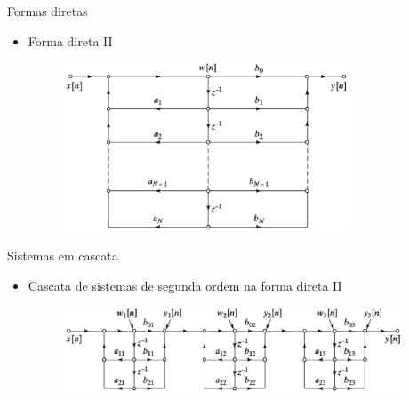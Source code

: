 \begin{slide}{Formas diretas}
   \begin{itemize}
     \item Forma direta II
   \begin{figure}
       \centering
        \includegraphics[width = 0.8\textwidth]{figs/f2.eps}
   \end{figure}
  \end{itemize}
\end{slide}

\begin{slide}{Sistemas em cascata }
\begin{itemize}
   \item Cascata de sistemas de segunda ordem na forma direta II
   \begin{figure}
       \centering
        \includegraphics[width = 0.95\textwidth]{figs/cascade.eps}
   \end{figure}
\end{itemize}
\end{slide}

